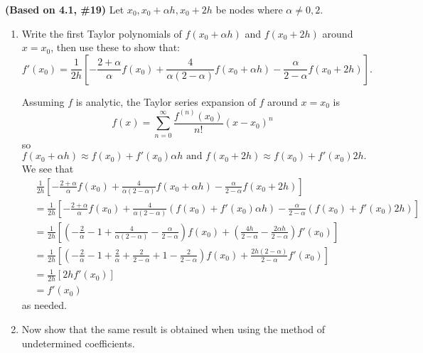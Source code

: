 \documentclass{eh-homework}
\begin{document}
\begin{question}{5}
\textbf{(Based on 4.1, \#19)} Let \( x_0, x_0 + \alpha h, x_0 + 2h \) be nodes where \( \alpha \neq 0,2 \).

\begin{enumerate}[label=\alph*.]
    \item Write the first Taylor polynomials of \( f(x_0 +\alpha h) \) and \( f(x_0 +2h) \) around \( x = x_0 \), then use these to show that:
    \[
    f'(x_0) = \frac{1}{2h} \left[ -\frac{2+\alpha}{\alpha} f(x_0) + \frac{4}{\alpha(2-\alpha)} f(x_0 + \alpha h) - \frac{\alpha}{2-\alpha} f(x_0 + 2h) \right].
    \]

    Assuming \(f\) is analytic, the Taylor series expansion of \(f\) around \(x = x_0\) is
    \[
        f(x) = \sum_{n=0}^{\infty} \frac{f^{(n)}(x_0)}{n!}(x - x_0)^n
    \]
    so
    \[
        f(x_0 + \alpha h) \approx f(x_0) + f'(x_0) \alpha h \text{ and } f(x_0 + 2h) \approx f(x_0) + f'(x_0) 2h.
    \]
    We see that
    \begin{align*}
        &\ \frac{1}{2h} \left[ -\frac{2+\alpha}{\alpha} f(x_0) + \frac{4}{\alpha(2-\alpha)} f(x_0 + \alpha h) - \frac{\alpha}{2-\alpha} f(x_0 + 2h) \right] \\
        &= \frac{1}{2h} \left[ -\frac{2+\alpha}{\alpha} f(x_0) + \frac{4}{\alpha(2-\alpha)} (f(x_0) + f'(x_0) \alpha h) - \frac{\alpha}{2-\alpha} (f(x_0) + f'(x_0) 2h) \right] \\
        &= \frac{1}{2h}\left[ \left( -\frac{2}{\alpha} - 1 + \frac{4}{\alpha (2 - \alpha)} - \frac{\alpha}{2 - \alpha} \right) f(x_0) + \left( \frac{4h}{2 - \alpha} - \frac{2\alpha h}{2 - \alpha} \right) f'(x_0) \right] \\
        &= \frac{1}{2h}\left[ \left( -\frac{2}{\alpha} - 1 + \frac{2}{\alpha} + \frac{2}{2 - \alpha} + 1 - \frac{2}{2 - \alpha} \right) f(x_0) + \frac{2h(2 - \alpha)}{2 - \alpha} f'(x_0) \right] \\
        &= \frac{1}{2h}[2h f'(x_0)] \\
        &= f'(x_0)
    \end{align*}
    as needed.

    \item Now show that the same result is obtained when using the method of undetermined coefficients.
    

\end{enumerate}
\end{question}
\end{document}
